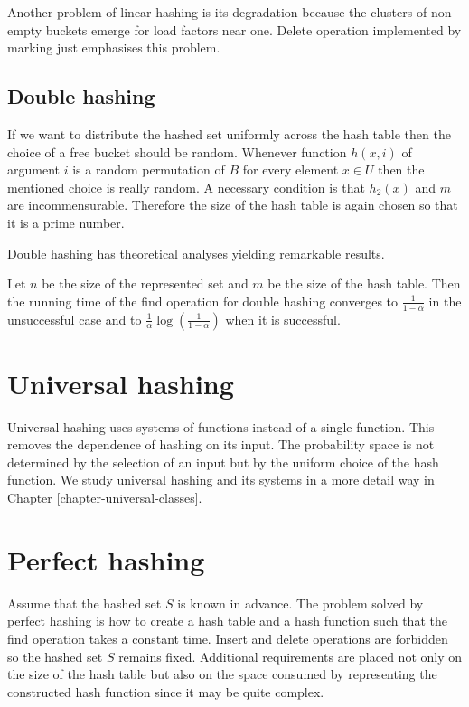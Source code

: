 Another problem of linear hashing is its degradation because the clusters of non-empty buckets emerge for load factors near one. Delete operation implemented by marking just emphasises this problem.

\subsection{Double hashing}
If we want to distribute the hashed set uniformly across the hash table then the choice of a free bucket should be random. Whenever function $h(x, i)$ of argument $i$ is a random permutation of $B$ for every element $x \in U$ then the mentioned choice is really random. A necessary condition is that $h_2(x)$ and $m$ are incommensurable. Therefore the size of the hash table is again chosen so that it is a prime number. 

Double hashing has theoretical analyses yielding remarkable results.
\begin{theorem}
Let $n$ be the size of the represented set and $m$ be the size of the hash table. Then the running time of the find operation for double hashing converges to $\frac{1}{1 - \alpha}$ in the unsuccessful case and to $\frac{1}{\alpha}\log\left(\frac{1}{1 - \alpha}\right)$ when it is successful.
\end{theorem}

\section{Universal hashing}
Universal hashing uses systems of functions instead of a single function. This removes the dependence of hashing on its input. The probability space is not determined by the selection of an input but by the uniform choice of the hash function. We study universal hashing and its systems in a more detail way in Chapter \ref{chapter-universal-classes}.

\section{Perfect hashing}
Assume that the hashed set $S$ is known in advance. The problem solved by perfect hashing is how to create a hash table and a hash function such that the find operation takes a constant time. Insert and delete operations are forbidden so the hashed set $S$ remains fixed. Additional requirements are placed not only on the size of the hash table but also on the space consumed by representing the constructed hash function since it may be quite complex.

